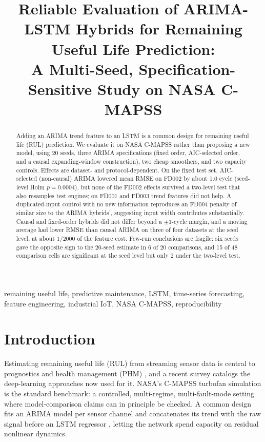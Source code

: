 \documentclass[conference]{IEEEtran}
\begin{document}
\title{Reliable Evaluation of ARIMA-LSTM Hybrids for Remaining Useful Life Prediction: \\ A Multi-Seed, Specification-Sensitive Study on NASA C-MAPSS}

\author{
}

\maketitle

\begin{abstract}
Adding an ARIMA trend feature to an LSTM is a common design for remaining useful life (RUL) prediction. We evaluate it on NASA C-MAPSS rather than proposing a new model, using 20 seeds, three ARIMA specifications (fixed order, AIC-selected order, and a causal expanding-window construction), two cheap smoothers, and two capacity controls. Effects are dataset- and protocol-dependent. On the fixed test set, AIC-selected (non-causal) ARIMA lowered mean RMSE on FD002 by about 1.0 cycle (seed-level Holm $p=0.0004$), but none of the FD002 effects survived a two-level test that also resamples test engines; on FD001 and FD003 trend features did not help. A duplicated-input control with no new information reproduces an FD004 penalty of similar size to the ARIMA hybrids', suggesting input width contributes substantially. Causal and fixed-order hybrids did not differ beyond a $\pm1$-cycle margin, and a moving average had lower RMSE than causal ARIMA on three of four datasets at the seed level, at about $1/2000$ of the feature cost. Few-run conclusions are fragile: six seeds gave the opposite sign to the 20-seed estimate in 6 of 20 comparisons, and 15 of 48 comparison cells are significant at the seed level but only 2 under the two-level test.
\end{abstract}

\begin{IEEEkeywords}
remaining useful life, predictive maintenance, LSTM, time-series forecasting, feature engineering, industrial IoT, NASA C-MAPSS, reproducibility
\end{IEEEkeywords}

\section{Introduction}
Estimating remaining useful life (RUL) from streaming sensor data is central to prognostics and health management (PHM) \cite{saxena2008}, and a recent survey \cite{survey2025} catalogs the deep-learning approaches now used for it. NASA's C-MAPSS turbofan simulation \cite{saxena2008} is the standard benchmark: a controlled, multi-regime, multi-fault-mode setting where model-comparison claims can in principle be checked. A common design fits an ARIMA model per sensor channel and concatenates its trend with the raw signal before an LSTM regressor \cite{zhang2003}, letting the network spend capacity on residual nonlinear dynamics.
\end{document}
